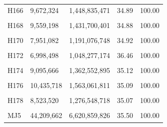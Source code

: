 \documentclass[
  a4paper,
  titlepage]{article}
\begin{document}
\begin{longtable}[t]{lllll}
H166 & 9,672,324 & 1,448,835,471 & 34.89 & 100.00\\
 
\cellcolor{gray!6}{H167} & \cellcolor{gray!6}{8,970,604} & \cellcolor{gray!6}{1,343,670,722} & \cellcolor{gray!6}{36.39} & \cellcolor{gray!6}{100.00}\\
 
H168 & 9,559,198 & 1,431,700,401 & 34.88 & 100.00\\
 
\cellcolor{gray!6}{H169} & \cellcolor{gray!6}{7,990,816} & \cellcolor{gray!6}{1,196,646,811} & \cellcolor{gray!6}{34.57} & \cellcolor{gray!6}{100.00}\\
 
H170 & 7,951,082 & 1,191,076,748 & 34.92 & 100.00\\
 
\cellcolor{gray!6}{H171} & \cellcolor{gray!6}{10,698,960} & \cellcolor{gray!6}{1,602,615,056} & \cellcolor{gray!6}{34.92} & \cellcolor{gray!6}{100.00}\\
 
H172 & 6,998,498 & 1,048,277,174 & 36.46 & 100.00\\
 
\cellcolor{gray!6}{H173} & \cellcolor{gray!6}{7,296,598} & \cellcolor{gray!6}{1,092,804,407} & \cellcolor{gray!6}{35.15} & \cellcolor{gray!6}{100.00}\\
 
H174 & 9,095,666 & 1,362,552,895 & 35.12 & 100.00\\
 
\cellcolor{gray!6}{H175} & \cellcolor{gray!6}{8,087,960} & \cellcolor{gray!6}{1,211,553,230} & \cellcolor{gray!6}{34.39} & \cellcolor{gray!6}{100.00}\\
 
H176 & 10,435,718 & 1,563,061,811 & 35.09 & 100.00\\
 
\cellcolor{gray!6}{H177} & \cellcolor{gray!6}{7,247,366} & \cellcolor{gray!6}{1,085,315,692} & \cellcolor{gray!6}{34.20} & \cellcolor{gray!6}{100.00}\\
 
H178 & 8,523,520 & 1,276,548,718 & 35.07 & 100.00\\
 
\cellcolor{gray!6}{H179} & \cellcolor{gray!6}{7,408,978} & \cellcolor{gray!6}{1,109,624,905} & \cellcolor{gray!6}{34.88} & \cellcolor{gray!6}{100.00}\\
 
MJ5 & 44,209,662 & 6,620,859,826 & 35.50 & 100.00\\*
\end{longtable}
\end{document}
